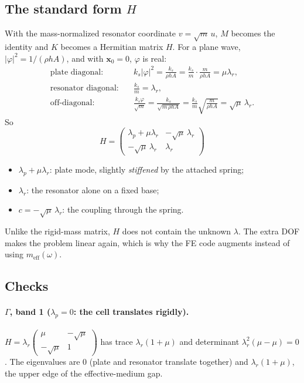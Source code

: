 \subsection{The standard form $H$}
With the mass-normalized resonator coordinate $v = \sqrt{m}\,u$, $M$ becomes
the identity and $K$ becomes a Hermitian matrix $H$. For a plane wave,
$|\varphi|^2 = 1/(\rho h A)$, and with $\mathbf{x}_0 = 0$, $\varphi$ is real:
\begin{align}
  \text{plate diagonal:} \quad & k_s|\varphi|^2 = \frac{k_s}{\rho h A} = \frac{k_s}{m}\cdot\frac{m}{\rho h A} = \mu\lambda_r, \\
  \text{resonator diagonal:} \quad & \frac{k_s}{m} = \lambda_r, \\
  \text{off-diagonal:} \quad & \frac{k_s\varphi}{\sqrt{m}} = \frac{k_s}{\sqrt{m\,\rho h A}} = \frac{k_s}{m}\sqrt{\frac{m}{\rho h A}} = \sqrt{\mu}\,\lambda_r .
\end{align}
So
\begin{equation}
  \boxed{\;H = \begin{pmatrix} \lambda_p + \mu\lambda_r & -\sqrt{\mu}\,\lambda_r \\ -\sqrt{\mu}\,\lambda_r & \lambda_r \end{pmatrix}\;}
  \label{eq:H_resonator}
\end{equation}
\begin{itemize}
  \item $\lambda_p + \mu\lambda_r$: plate mode, slightly \emph{stiffened} by the
        attached spring;
  \item $\lambda_r$: the resonator alone on a fixed base;
  \item $c = -\sqrt{\mu}\,\lambda_r$: the coupling through the spring.
\end{itemize}
Unlike the rigid-mass matrix, $H$ does not contain the unknown $\lambda$. The
extra DOF makes the problem linear again, which is why the FE code augments
instead of using $m_\mathrm{eff}(\omega)$.

\subsection{Checks}

\paragraph{$\Gamma$, band 1 ($\lambda_p = 0$: the cell translates rigidly).}
$H = \lambda_r \begin{pmatrix} \mu & -\sqrt{\mu} \\ -\sqrt{\mu} & 1 \end{pmatrix}$
has trace $\lambda_r(1+\mu)$ and determinant $\lambda_r^2(\mu - \mu) = 0$. The
eigenvalues are $0$ (plate and resonator translate together) and
$\lambda_r(1+\mu)$, the upper edge of the effective-medium gap.

